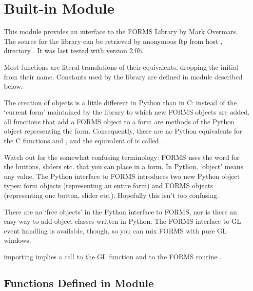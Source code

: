 \section{Built-in Module }



This module provides an interface to the FORMS Library by Mark Overmars.  The source for the
library can be retrieved by anonymous ftp from host
, directory .  It was last tested
with version 2.0b.

Most functions are literal translations of their \C{} equivalents,
dropping the initial  from their name.  Constants used by
the library are defined in module  described below.

The creation of objects is a little different in Python than in C:
instead of the `current form' maintained by the library to which new
FORMS objects are added, all functions that add a FORMS object to a
form are methods of the Python object representing the form.
Consequently, there are no Python equivalents for the C functions
 and , and the
equivalent of  is called
.

Watch out for the somewhat confusing terminology: FORMS uses the word
 for the buttons, sliders etc. that you can place in a form.
In Python, `object' means any value.  The Python interface to FORMS
introduces two new Python object types: form objects (representing an
entire form) and FORMS objects (representing one button, slider etc.).
Hopefully this isn't too confusing.

There are no `free objects' in the Python interface to FORMS, nor is
there an easy way to add object classes written in Python.  The FORMS
interface to GL event handling is available, though, so you can mix
FORMS with pure GL windows.

 importing  implies a call to the GL
function  and to the FORMS routine
.

\subsection{Functions Defined in Module }

